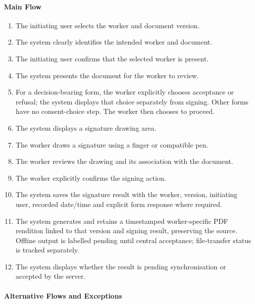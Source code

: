 \paragraph{Main Flow}

\begin{enumerate}
    \item The initiating user selects
    the worker and document version.
    \item The system clearly identifies
    the intended worker and document.
    \item The initiating user confirms
    that the selected worker is present.
    \item The system presents the document
    for the worker to review.
    \item For a decision-bearing form, the worker explicitly chooses acceptance or
    refusal; the system displays that choice separately from signing. Other forms
    have no consent-choice step. The worker then chooses to proceed.
    \item The system displays a signature
    drawing area.
    \item The worker draws a signature
    using a finger or compatible pen.
    \item The worker reviews the drawing
    and its association with the document.
    \item The worker explicitly confirms
    the signing action.
    \item The system saves the signature result
    with the worker, version, initiating user, recorded date/time and explicit form response where required.
    \item The system generates and retains a timestamped worker-specific PDF
    rendition linked to that version and signing result, preserving the source.
    Offline output is labelled pending until central acceptance; file-transfer
    status is tracked separately.
    \item The system displays whether the result
    is pending synchronisation
    or accepted by the server.
\end{enumerate}

\paragraph{Alternative Flows and Exceptions}

